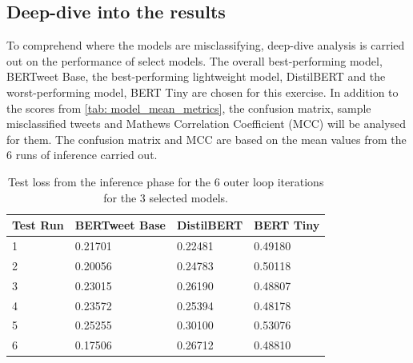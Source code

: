 \subsection{Deep-dive into the results}
To comprehend where the models are misclassifying, deep-dive analysis is carried out on the performance of select models. The overall best-performing model, BERTweet Base, the best-performing lightweight model, DistilBERT and the worst-performing model, BERT Tiny are chosen for this exercise. In addition to the scores from \ref{tab: model_mean_metrics}, the confusion matrix, sample misclassified tweets and Mathews Correlation Coefficient (MCC) will be analysed for them. The confusion matrix and MCC are based on the mean values from the 6 runs of inference carried out.\\
\begin{table}[ht]
    \centering
    \begin{tabularx}{\textwidth}{|X|X|X|X|}
        \hline
        \rowcolor[gray]{0.7}
        \textbf{Test Run} & \textbf{BERTweet Base} & \textbf{DistilBERT} & \textbf{BERT Tiny} \\
        \hline
        1                 & 0.21701                & 0.22481             & 0.49180            \\
        \rowcolor[gray]{0.9}
        2                 & 0.20056                & 0.24783             & 0.50118            \\
        3                 & 0.23015                & 0.26190             & 0.48807            \\
        \rowcolor[gray]{0.9}
        4                 & 0.23572                & 0.25394             & 0.48178            \\
        5                 & 0.25255                & 0.30100             & 0.53076            \\
        \rowcolor[gray]{0.9}
        6                 & 0.17506                & 0.26712             & 0.48810            \\
        \hline
    \end{tabularx}
    \caption{Test loss from the inference phase for the 6 outer loop iterations for the 3 selected models.}
    \label{tab: test_loss}
\end{table}

